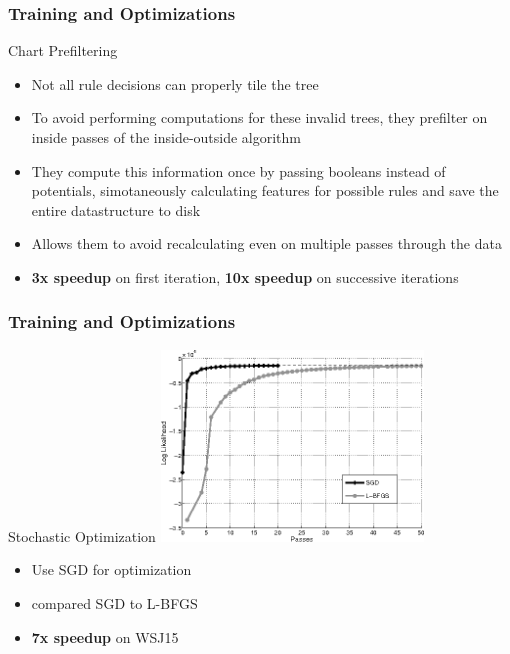 \documentclass{beamer}
\begin{document}
\begin{frame}
  \frametitle{Training and Optimizations}
  \begin{block}{Chart Prefiltering}
    \begin{itemize}
      \item Not all rule decisions can properly tile the tree
      \item To avoid performing computations for these invalid trees, they prefilter on inside
            passes of the inside-outside algorithm
      \item They compute this information once by passing booleans instead of potentials,
            simotaneously calculating features for possible rules and save the entire datastructure
            to disk
      \item Allows them to avoid recalculating even on multiple passes through the data
      \item \textbf{3x speedup} on first iteration, \textbf{10x speedup} on successive iterations
    \end{itemize}
  \end{block}
\end{frame}


\begin{frame}
  \frametitle{Training and Optimizations}
  \begin{block}{Stochastic Optimization}
    \includegraphics[height=2in]{stochastic.png}
    \begin{itemize}
      \item Use SGD for optimization
      \item compared SGD to L-BFGS
      \item \textbf{7x speedup} on WSJ15
    \end{itemize}
  \end{block}
\end{frame}
\end{document}

